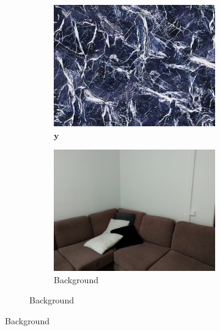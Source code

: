 \begin{figure}[]
    \centering    
    \begin{subfigure}{\textwidth}
        \centering
        \begin{subfigure}{0.24\textwidth}
            \centering
            \includegraphics[width=\textwidth]{images/04-experiment02/sofa/marble/target.jpg}
            \caption*{\(\bm{y}\)}
        \end{subfigure}
        \hfill
        \begin{subfigure}{0.24\textwidth}
            \centering
            \includegraphics[width=\textwidth]{images/04-experiment02/sofa/bg.jpg}
            \caption*{Background}

\end{subfigure}
\end{subfigure}
\end{figure}
